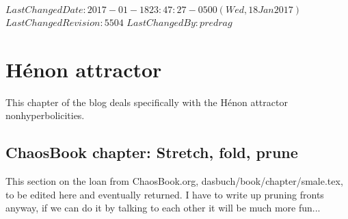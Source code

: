 \ifsvnmulti
 {$LastChangedDate: 2017-01-18 23:47:27 -0500 (Wed, 18 Jan 2017) $}
 {$LastChangedRevision: 5504 $} {$LastChangedBy: predrag $}
\fi

\chapter{H\'enon  attractor}
\label{c-Henon}

This chapter of the blog deals specifically with the
H\'enon attractor nonhyperbolicities.

\section{ChaosBook chapter: Stretch, fold, prune}
\label{c-smale}



\noindent
This section on the loan from ChaosBook.org,
dasbuch/book/chapter/smale.tex, to be edited here and eventually
returned. I have to write up pruning fronts anyway, if we can do it by
talking to each other it will be much more fun...

\Remarks

